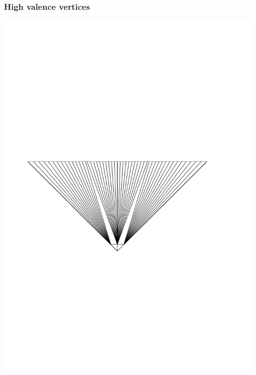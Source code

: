 \documentclass[14pt]{beamer}
\begin{document}
\begin{frame}
\frametitle{High valence vertices}
\begin{center}
\includegraphics[scale=0.6, trim = 0 0 0 250]{HV_2.png}
\end{center}
\end{frame}
\end{document}
